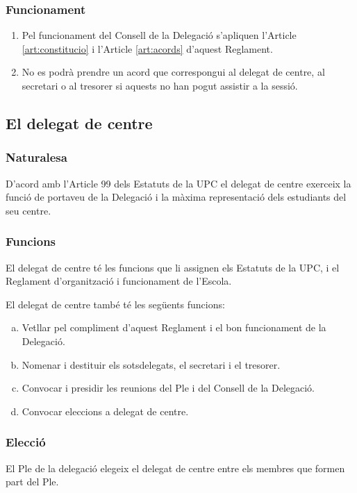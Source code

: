 \documentclass[a4paper,12pt]{article}
\renewcommand*{\thesubsubsection}{\arabic{subsubsection}}
\begin{document}
\subsubsection{Funcionament}
\begin{enumerate}[\thesubsubsection.1]
	\item Pel funcionament del Consell de la Delegació s'apliquen l'Article \ref{art:constitucio} i l'Article \ref{art:acords} d'aquest Reglament.
	\item No es podrà prendre un acord que correspongui al delegat de centre, al secretari o al tresorer si aquests no han pogut assistir a la sessió.
\end{enumerate}

\subsection{El delegat de centre}
\subsubsection{Naturalesa}
D'acord amb l'Article 99 dels Estatuts de la UPC el delegat de centre exerceix la funció de portaveu de la Delegació i la màxima representació dels estudiants del seu centre.

\subsubsection{Funcions}
El delegat de centre té les funcions que li assignen els Estatuts de la UPC, i el Reglament d'organització i funcionament de l'Escola.

El delegat de centre també té les següents funcions:
\begin{enumerate}[a)]
	\item Vetllar pel compliment d'aquest Reglament i el bon funcionament de la Delegació.
	\item Nomenar i destituir els sotsdelegats, el secretari i el tresorer.
	\item Convocar i presidir les reunions del Ple i del Consell de la Delegació.
	\item Convocar eleccions a delegat de centre.
\end{enumerate}

\subsubsection{Elecció}
El Ple de la delegació elegeix el delegat de centre entre els membres que formen part del Ple.
\end{document}
